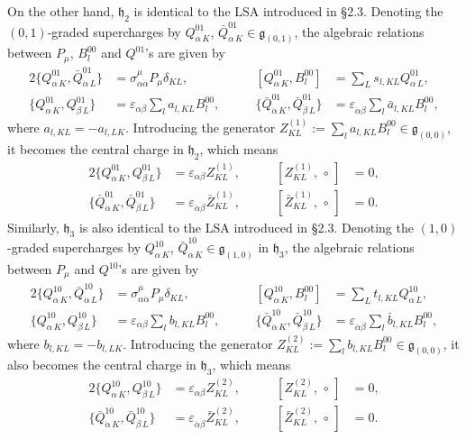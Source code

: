 \documentclass[a4paper,12pt]{article}
\def\nn{\nonumber}
\def\ua{\alpha}
\def\da{\dot{\alpha}}
\def\ub{\beta}
\def\db{\dot{\beta}}
\def\g{\mathfrak{g}}
\def\h{\mathfrak{h}}
\theoremstyle{plain}
\theoremstyle{definition}
\begin{document}
On the other hand, $\h_2$ is identical to the LSA introduced in \S 2.3.
Denoting the $(0,1)$-graded supercharges by $Q_{\ua\,K}^{01}$, $\bar Q_{\da\,K}^{01}\in \g_{(0,1)}$,
the algebraic relations between $P_\mu$, $B^{00}_l$ and $Q^{01}$'s are given by
\begin{alignat}{2}
 \{Q^{01}_{\ua\,K}, \bar Q^{01}_{\da\,L}\} &=\sigma^{\mu}_{\ua\da}P_\mu\delta_{KL},\qquad&
 [Q^{01}_{\ua\,K},B_l^{00}]&=\sum_L s_{l,KL}Q^{01}_{\ua\,L}, \nn\\
\{Q^{01}_{\ua\,K}, Q^{01}_{\ub\,L}\} &= \varepsilon_{\ua\ub} \sum_l a_{l,KL} B^{00}_l,\qquad&
\{\bar Q^{01}_{\da\,K}, \bar Q^{01}_{\db\,L}\} &= \varepsilon_{\da\db} \sum_l \bar a_{l,KL} B^{00}_l, 
\end{alignat}
where $a_{l,KL}=-a_{l,LK}$. Introducing the generator $Z^{(1)}_{KL}:=\sum_l a_{l,KL} B^{00}_l\in\g_{(0,0)}$, it becomes the central charge in $\h_2$, which means
\begin{alignat}{2}
\{Q^{01}_{\ua\,K}, Q^{01}_{\ub\,L}\} &= \varepsilon_{\ua\ub} Z^{(1)}_{KL},\qquad&
 [Z^{(1)}_{KL},\,\circ\,]&=0,
\nn\\
\{\bar Q^{01}_{\da\,K}, \bar Q^{01}_{\db\,L}\} &= \varepsilon_{\da\db} \bar Z^{(1)}_{KL},\qquad&
 [\bar Z^{(1)}_{KL},\,\circ\,]&=0.
\end{alignat}
Similarly, $\h_3$ is also identical to the LSA introduced in \S 2.3.
Denoting the $(1,0)$-graded supercharges by $Q_{\ua\,K}^{10}$, $\bar Q_{\da\,K}^{10}\in \g_{(1,0)}$ in $\h_3$, the algebraic relations between $P_\mu$ and $Q^{10}$'s are given by
\begin{alignat}{2}
 \{Q^{10}_{\ua\,K}, \bar Q^{10}_{\da\,L}\} &=\sigma^{\mu}_{\ua\da}P_\mu\delta_{KL},\qquad&
 [Q^{10}_{\ua\,K},B_l^{00}]&=\sum_L t_{l,KL}Q^{10}_{\ua\,L},\nn\\
\{Q^{10}_{\ua\,K}, Q^{10}_{\ub\,L}\} &= \varepsilon_{\ua\ub} \sum_l b_{l,KL} B^{00}_l,\qquad&
\{\bar Q^{10}_{\da\,K}, \bar Q^{10}_{\db\,L}\} &= \varepsilon_{\da\db} \sum_l \bar b_{l,KL} B^{00}_l, 
\end{alignat}
where $b_{l,KL}=-b_{l,LK}$. Introducing the generator $Z^{(2)}_{KL}:=\sum_l b_{l,KL} B^{00}_l \in\g_{(0,0)}$, it also becomes the central charge in $\h_3$, which means
\begin{alignat}{2}
\{Q^{10}_{\ua\,K}, Q^{10}_{\ub\,L}\} &= \varepsilon_{\ua\ub} Z^{(2)}_{KL},\qquad&
 [Z^{(2)}_{KL},\,\circ\,]&=0,
\nn\\
\{\bar Q^{10}_{\da\,K}, \bar Q^{10}_{\db\,L}\} &= \varepsilon_{\da\db} \bar Z^{(2)}_{KL},\qquad&
 [\bar Z^{(2)}_{KL},\,\circ\,]&=0.
\end{alignat}
\end{document}
